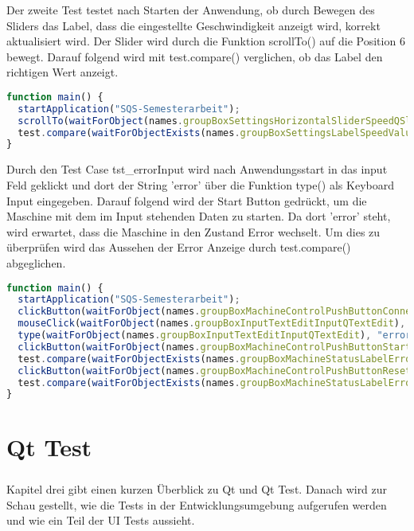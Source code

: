 		Der zweite Test testet nach Starten der Anwendung, ob durch Bewegen des Sliders das Label, dass die eingestellte Geschwindigkeit anzeigt wird, korrekt aktualisiert wird. Der Slider wird durch die Funktion scrollTo() auf die Position 6 bewegt. Darauf folgend wird mit test.compare() verglichen, ob das Label den richtigen Wert anzeigt.
		
		\begin{lstlisting}[language=JavaScript, caption=tst\_slider]
function main() {
  startApplication("SQS-Semesterarbeit");
  scrollTo(waitForObject(names.groupBoxSettingsHorizontalSliderSpeedQSlider), 6);
  test.compare(waitForObjectExists(names.groupBoxSettingsLabelSpeedValueQLabel).text, "6");
}

		\end{lstlisting}
		
		Durch den Test Case tst\_errorInput wird nach Anwendungsstart in das input Feld geklickt und dort der String 'error' über die Funktion type() als Keyboard Input eingegeben. Darauf folgend wird der Start Button gedrückt, um die Maschine mit dem im Input stehenden Daten zu starten. Da dort 'error' steht, wird erwartet, dass die Maschine in den Zustand Error wechselt. Um dies zu überprüfen wird das Aussehen der Error Anzeige durch test.compare() abgeglichen.
		
		\begin{lstlisting}[language=JavaScript, caption=tst\_errorInput]
function main() {
  startApplication("SQS-Semesterarbeit");
  clickButton(waitForObject(names.groupBoxMachineControlPushButtonConnectQPushButton));
  mouseClick(waitForObject(names.groupBoxInputTextEditInputQTextEdit), 234, 156, Qt.NoModifier, Qt.LeftButton);
  type(waitForObject(names.groupBoxInputTextEditInputQTextEdit), "error");
  clickButton(waitForObject(names.groupBoxMachineControlPushButtonStartQPushButton));
  test.compare(waitForObjectExists(names.groupBoxMachineStatusLabelErrorStatusQLabel).styleSheet, "border-radius: 6px; background-color: rgb(203, 47, 47)");
  clickButton(waitForObject(names.groupBoxMachineControlPushButtonResetErrorAndEStopQPushButton));
  test.compare(waitForObjectExists(names.groupBoxMachineStatusLabelErrorStatusQLabel).styleSheet, "border-radius: 6px; background-color: rgb(27, 193, 00)");
}
\end{lstlisting}
		
\chapter{Qt Test}
		\paragraph{}Kapitel drei gibt einen kurzen Überblick zu Qt und Qt Test. Danach wird zur Schau gestellt, wie die Tests in der Entwicklungsumgebung aufgerufen werden und wie ein Teil der UI Tests aussieht.
